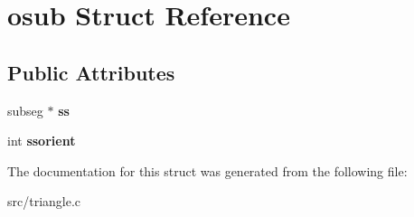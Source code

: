 \hypertarget{structosub}{
\section{osub Struct Reference}
\label{structosub}
}
\subsection*{Public Attributes}
\begin{DoxyCompactItemize}
\item 
\hypertarget{structosub_ac8cba05ff0ad570decd4376b4916d150}{
subseg $\ast$ {\bfseries ss}}
\label{structosub_ac8cba05ff0ad570decd4376b4916d150}

\item 
\hypertarget{structosub_aa9aac96631bf818c077048456dcf11ee}{
int {\bfseries ssorient}}
\label{structosub_aa9aac96631bf818c077048456dcf11ee}

\end{DoxyCompactItemize}


The documentation for this struct was generated from the following file:\begin{DoxyCompactItemize}
\item 
src/triangle.c\end{DoxyCompactItemize}

